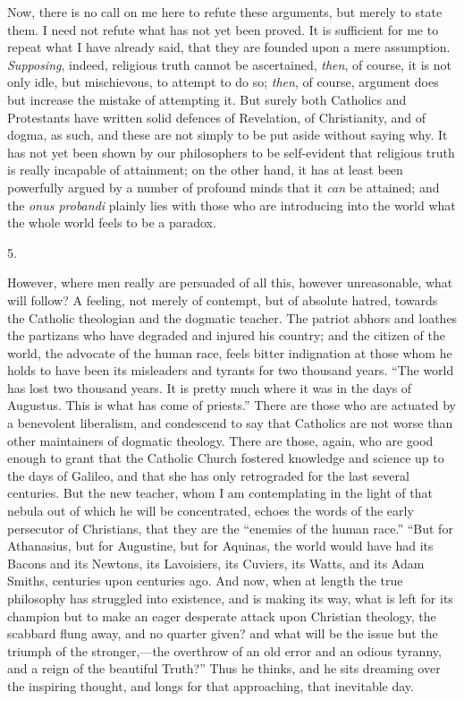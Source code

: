 Now, there is no call on me here to refute these arguments, but
merely to state them. I need not refute what has not yet been proved.
It is sufficient for me to repeat what I have already said, that they
are founded upon a mere assumption. \emph{Supposing}, indeed,
religious truth cannot be ascertained, \emph{then}, of course, it is
not only idle, but mischievous, to attempt to do so; \emph{then}, of
course, argument does but increase the mistake of attempting it. But
surely both Catholics and Protestants have written solid defences of
Revelation, of Christianity, and of dogma, as such, and these are not
simply to be put aside without saying why. It has not yet been shown
by our philosophers to be self-evident that religious truth is really
incapable of attainment; on the other hand, it has at least been
powerfully argued by a number of profound minds that it \emph{can} be
attained; and the \emph{onus probandi} plainly lies with those who are
introducing into the world what the whole world feels to be a paradox.

5.

However, where men really are persuaded of all this, however
unreasonable, what will follow? A feeling, not merely of contempt, but
of absolute hatred, towards the Catholic theologian and the dogmatic
teacher. The patriot abhors and loathes the partizans who have
degraded and injured his country; and the citizen of the world, the
advocate of the human race, feels bitter indignation at those whom he
holds to have been its misleaders and tyrants for two thousand years.
``The world has lost two thousand years. It is pretty much where
it was in the days of Augustus. This is what has come of
priests.'' There are those who are actuated by a benevolent
liberalism, and condescend to say that Catholics are not worse than
other maintainers of dogmatic theology. There are those, again,
who are good enough to grant that the Catholic Church fostered
knowledge and science up to the days of Galileo, and that she has only
retrograded for the last several centuries. But the new teacher, whom
I am contemplating in the light of that nebula out of which he will be
concentrated, echoes the words of the early persecutor of Christians,
that they are the ``enemies of the human race.'' ``But for
Athanasius, but for Augustine, but for Aquinas, the world would have
had its Bacons and its Newtons, its Lavoisiers, its Cuviers, its
Watts, and its Adam Smiths, centuries upon centuries ago. And now,
when at length the true philosophy has struggled into existence, and
is making its way, what is left for its champion but to make an eager
desperate attack upon Christian theology, the scabbard flung away, and
no quarter given? and what will be the issue but the triumph of the
stronger,—the overthrow of an old error and an odious tyranny, and a
reign of the beautiful Truth?'' Thus he thinks, and he sits
dreaming over the inspiring thought, and longs for that approaching,
that inevitable day.

